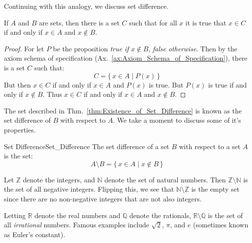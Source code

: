         Continuing with this analogy, we discuss set difference.
        \begin{theorem}
            \label{thm:Existence_of_Set_Difference}%
            If $A$ and $B$ are sets, then there is a set $C$ such that for all
            $x$ it is true that $x\in{C}$ if and only if $x\in{A}$ and
            $x\notin{B}$.
        \end{theorem}
        \begin{proof}
            For let $P$ be the proposition \textit{true if} $x\notin{B}$,
            \textit{false otherwise}. Then by the axiom schema of specification
            (Ax.~\ref{ax:Axiom_Schema_of_Specification}), there is a set $C$
            such that:
            \begin{equation}
                C=\{\,x\in{A}\;|\;P(x)\,\}
            \end{equation}
            But then $x\in{C}$ if and only if $x\in{A}$ and $P(x)$ is true.
            But $P(x)$ is true if and only if $x\notin{B}$. Thus $x\in{C}$ if
            and only if $x\in{A}$ and $x\notin{B}$.
        \end{proof}
        The set described in Thm.~\ref{thm:Existence_of_Set_Difference} is known
        as the set difference of $B$ with respect to $A$. We take a moment to
        discuss some of it's properties.
        \begin{fdefinition}{Set Difference}{Set_Difference}
            The set difference of a set $B$ with respect to a set $A$ is the
            set:
            \begin{equation*}
                A\setminus{B}=\{\,x\in{A}\;|\;x\notin{B}\,\}
            \end{equation*}
        \end{fdefinition}
        \begin{example}
            Let $\mathbb{Z}$ denote the integers, and $\mathbb{N}$ denote the
            set of natural numbers. Then $\mathbb{Z}\setminus\mathbb{N}$ is the
            set of all negative integers. Flipping this, we see that
            $\mathbb{N}\setminus\mathbb{Z}$ is the empty set since there are no
            non-negative integers that are not also integers.
        \end{example}
        \begin{example}
            Letting $\mathbb{R}$ denote the real numbers and $\mathbb{Q}$ denote
            the rationals, $\mathbb{R}\setminus\mathbb{Q}$ is the set of all
            \textit{irrational} numbers. Famous examples include $\sqrt{2}$,
            $\pi$, and $e$ (sometimes known as Euler's constant).
        \end{example}
